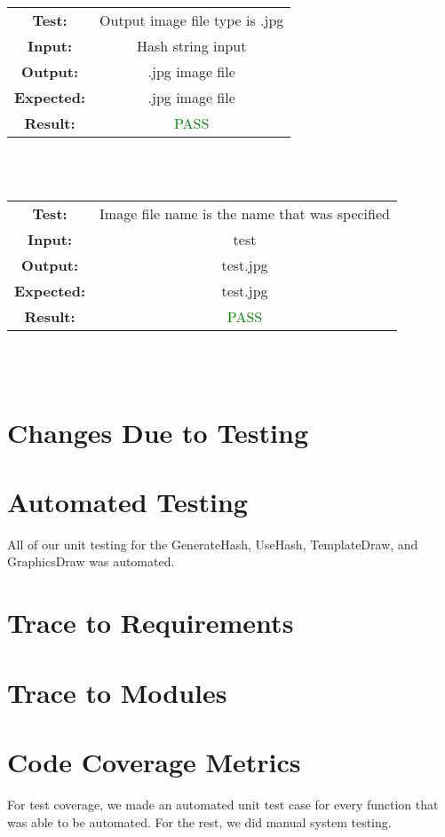 \documentclass[12pt, titlepage]{article}
\begin{document}
\begin{tabular}{|cc|}
    \hline
    \textbf{Test:} & Output image file type is .jpg \\
    \textbf{Input:} & Hash string input \\
    \textbf{Output:} & .jpg image file \\
    \textbf{Expected:} & .jpg image file  \\
    \textbf{Result:} & \textcolor{Green}{PASS} \\
    \hline
\end{tabular} \\ \\

\begin{tabular}{|cc|}
    \hline
    \textbf{Test:} & Image file name is the name that was specified \\
    \textbf{Input:} & test \\
    \textbf{Output:} & test.jpg \\
    \textbf{Expected:} & test.jpg \\
    \textbf{Result:} & \textcolor{Green}{PASS} \\
    \hline
\end{tabular} \\ \\

\section{Changes Due to Testing}

\section{Automated Testing}

All of our unit testing for the GenerateHash, UseHash, TemplateDraw, and GraphicsDraw was automated.

\section{Trace to Requirements}

\section{Trace to Modules}

\section{Code Coverage Metrics}

For test coverage, we made an automated unit test case for every function that was able to be automated. For the rest, we did manual system testing.




\end{document}

